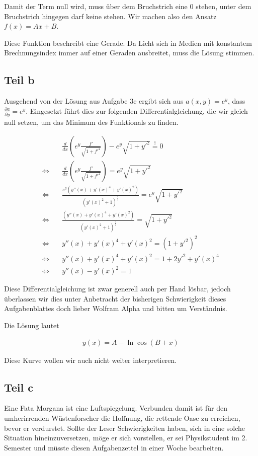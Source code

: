 \documentclass[a4paper,german,12pt,smallheadings]{scrartcl}
\begin{document}
Damit der Term null wird, muss über dem Bruchstrich eine $0$ stehen, unter dem
Bruchstrich hingegen darf keine stehen. Wir machen also den Ansatz $f(x) =
Ax+B$.

Diese Funktion beschreibt eine Gerade. Da Licht sich in Medien mit konstantem
Brechnungsindex immer auf einer Geraden ausbreitet, muss die Lösung stimmen.

\subsection*{Teil b}

Ausgehend von der Lösung aus Aufgabe 3e ergibt sich aus $a(x,y) = e^y$, dass
$\frac{\partial a}{\partial y} = e^y$. Eingesetzt führt dies zur
folgenden Differentialgleichung, die wir gleich null setzen, um das Minimum des
Funktionals zu finden.

\begin{align*}
  &\frac{d}{dx} \left(e^y \frac{f'}{\sqrt{1+f'^2}} \right) - e^y \sqrt{1+y'^2} \overset{!}{=} 0 \\
  \Leftrightarrow \quad &\frac{d}{dx} \left(e^y \frac{f'}{\sqrt{1+f'^2}} \right) = e^y \sqrt{1+y'^2} \\
  \Leftrightarrow \quad &\frac{e^y \left(y''(x) + y'(x)^4 + y'(x)^2\right)}{(y'(x)^2 + 1)^\frac{3}{2}} = e^y \sqrt{1+y'^2} \\
  \Leftrightarrow \quad &\frac{\left(y''(x) + y'(x)^4 + y'(x)^2\right)}{(y'(x)^2 + 1)^\frac{3}{2}} = \sqrt{1+y'^2} \\
  \Leftrightarrow \quad &y''(x) + y'(x)^4 + y'(x)^2 = \left(1+y'^2\right)^2 \\
  \Leftrightarrow \quad &y''(x) + y'(x)^4 + y'(x)^2 = 1+2y'^2+y'(x)^4 \\
  \Leftrightarrow \quad &y''(x) - y'(x)^2 = 1
\end{align*}

Diese Differentialgleichung ist zwar generell auch per Hand lösbar, jedoch
überlassen wir dies unter Anbetracht der bisherigen Schwierigkeit dieses
Aufgabenblattes doch lieber Wolfram Alpha und bitten um Verständnis.

Die Lösung lautet

\begin{align*}
  y(x) = A - \ln \cos\left(B + x\right)
\end{align*}

Diese Kurve wollen wir auch nicht weiter interpretieren.

\subsection*{Teil c}
Eine Fata Morgana ist eine Luftspiegelung. Verbunden damit ist für den
umherirrenden Wüstenforscher die Hoffnung, die rettende Oase zu erreichen,
bevor er verdurstet. Sollte der Leser Schwierigkeiten haben, sich in eine
solche Situation hineinzuversetzen, möge er sich vorstellen, er sei
Physikstudent im 2. Semester und müsste diesen Aufgabenzettel in einer Woche
bearbeiten.
\end{document}
